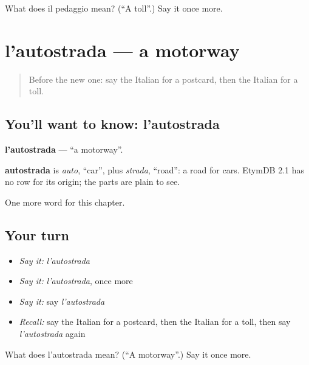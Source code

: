 \begin{tcolorbox}[breakable,colback=teal!4,colframe=teal!35!black,title={Before you move on}]
What does il pedaggio mean? (\textquotedblleft{}A toll\textquotedblright{}.) Say it once more.
\end{tcolorbox}
\section[l'autostrada]{l'autostrada — a motorway}

\label{lesson:IT-C167-autostrada}



\begin{quote}
Before the new one: say the Italian for a postcard, then the Italian for a toll.
\end{quote}

\subsection*{You'll want to know: l'autostrada}
\textbf{l'autostrada} — \textquotedblleft{}a motorway\textquotedblright{}.

\begin{cousinweb}
\textbf{autostrada} is \emph{auto}, \textquotedblleft{}car\textquotedblright{}, plus \emph{strada}, \textquotedblleft{}road\textquotedblright{}: a road for cars. EtymDB 2.1 has no row for its origin; the parts are plain to see.
\end{cousinweb}

\begin{grammarlens}[title={What you've built}]
One more word for this chapter.
\end{grammarlens}

\subsection*{Your turn}
\begin{itemize}
\raggedright
  \item \emph{Say it:} \emph{l'autostrada}
  \item \emph{Say it:} \emph{l'autostrada}, once more
  \item \emph{Say it:} say \emph{l'autostrada}
  \item \emph{Recall:} say the Italian for a postcard, then the Italian for a toll, then say \emph{l'autostrada} again
\end{itemize}

\begin{tcolorbox}[breakable,colback=teal!4,colframe=teal!35!black,title={Before you move on}]
What does l'autostrada mean? (\textquotedblleft{}A motorway\textquotedblright{}.) Say it once more.
\end{tcolorbox}
